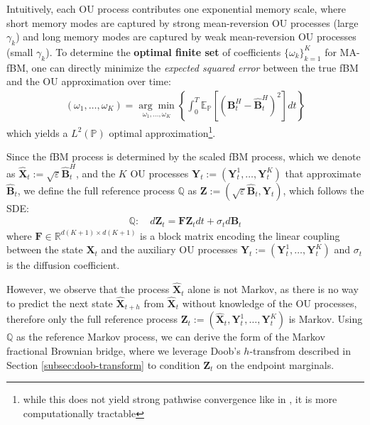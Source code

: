 \documentclass{article}
\begin{document}
Intuitively, each OU process contributes one exponential memory scale, where short memory modes are captured by strong mean-reversion OU processes (large $\gamma_k$) and long memory modes are captured by weak mean-reversion OU processes (small $\gamma_k$). To determine the \textbf{optimal finite set} of coefficients $\{\omega_k\}_{k=1}^K$ for MA-fBM, one can directly minimize the \textit{expected squared error} between the true fBM and the OU approximation over time:
\begin{align}
    (\omega_1, \dots, \omega_K)=\underset{\omega_1, \dots, \omega_K}{\arg\min}\left\{\int_0^T\mathbb{E}_{\mathbb{P}}\left[\left(\boldsymbol{B}_t^H-\widehat{\boldsymbol{B}}_t^H\right)^2\right]dt\right\}
\end{align}
which yields a $L^2(\mathbb{P})$ optimal approximation\footnote{while this does not yield strong pathwise convergence like in \citep{harms2019strong}, it is more computationally tractable}. 

Since the fBM process is determined by the scaled fBM process, which we denote as  $\widehat{\boldsymbol{X}}_t:=\sqrt{\varepsilon}\widehat{\boldsymbol{B}}_t^H$, and the $K$ OU processes $\boldsymbol{Y}_t:=(\boldsymbol{Y}_t^1, \dots, \boldsymbol{Y}_t^K)$ that approximate $\widehat{\boldsymbol{B}}_t$, we define the full reference process $\mathbb{Q}$ as $\boldsymbol{Z}:=(\sqrt{\varepsilon}\widehat{\boldsymbol{B}}_t, \boldsymbol{Y}_t)$, which follows the SDE:
\begin{align}
    \mathbb{Q}:\quad d\boldsymbol{Z}_t=\boldsymbol{F}\boldsymbol{Z}_tdt+\sigma_td\boldsymbol{B}_t\label{eq:frac-ref-sde}
\end{align}
where $\boldsymbol{F}\in \mathbb{R}^{d( K+1)\times d(K+1)}$ is a block matrix encoding the linear coupling between the state $\boldsymbol{X}_t$ and the auxiliary OU processes $\boldsymbol{Y}_t:=(\boldsymbol{Y}_t^1, \dots, \boldsymbol{Y}_t^K)$ and $\sigma_t$ is the diffusion coefficient. 

However, we observe that the process $\widehat{\boldsymbol{X}}_t$ alone is not Markov, as there is no way to predict the next state $\widehat{\boldsymbol{X}}_{t+h}$ from $\widehat{\boldsymbol{X}}_t$ without knowledge of the OU processes, therefore only the full reference process $\boldsymbol{Z}_t:=(\widehat{\boldsymbol{X}}_t, \boldsymbol{Y}_t^1, \dots, \boldsymbol{Y}_t^K)$ is Markov. Using $\mathbb{Q}$ as the reference Markov process, we can derive the form of the Markov fractional Brownian bridge, where we leverage Doob's $h$-transfrom described in Section \ref{subsec:doob-transform} to condition $\boldsymbol{Z}_t$ on the endpoint marginals.
\end{document}

